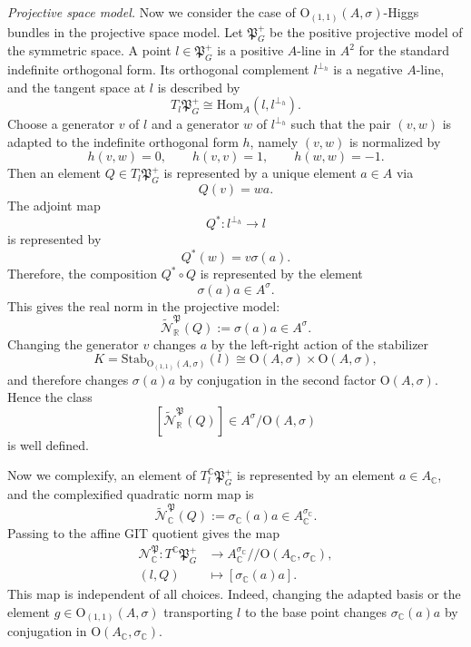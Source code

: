 \documentclass[oneside,11pt]{amsart}
\theoremstyle{definition}
\theoremstyle{remark}
\numberwithin{thm}{section}
\numberwithin{equation}{section}
\begin{document}
\noindent \textit{Projective space model.}
Now we consider the case of $\mathrm{O}_{(1,1)}(A,\sigma)$-Higgs bundles in the projective space model. Let $\mathfrak P_G^+$ be the positive projective model of the symmetric space. A point $l\in\mathfrak{P}_G^+$ is a positive $A$-line in $A^2$ for the standard indefinite orthogonal form. Its orthogonal complement $l^{\perp_h}$ is a negative $A$-line, and the tangent space at $l$ is described by
\[
T_l\mathfrak P_G^+\cong\mathrm{Hom}_A(l,l^{\perp_h}).
\]
Choose a generator $v$ of $l$ and a generator $w$ of $l^{\perp_h}$ such that the pair $(v,w)$ is adapted to the indefinite orthogonal form $h$, namely $(v,w)$ is normalized by
\[
h(v,w)=0,\qquad h(v,v)=1,\qquad h(w,w)=-1.
\]
Then an element $Q\in T_l\mathfrak P_G^+$ is represented by a unique element $a\in A$ via
\[
Q(v)=wa.
\]
The adjoint map
\[
Q^\ast:l^{\perp_h}\longrightarrow l
\]
is represented by
\[
Q^\ast(w)=v\sigma(a).
\]
Therefore, the composition $Q^\ast\circ Q$ is represented by the element
\[
\sigma(a)a\in A^\sigma.
\]
This gives the real norm in the projective model:
\[
\widetilde{\mathcal N}_{\mathbb R}^{\mathfrak P}(Q) := \sigma(a)a\in A^\sigma.
\]
Changing the generator $v$ changes $a$ by the left-right action of the stabilizer
\[
K=\mathrm{Stab}_{\mathrm{O}_{(1,1)}(A,\sigma)}(l)\cong \mathrm{O}(A,\sigma)\times\mathrm{O}(A,\sigma),
\]
and therefore changes $\sigma(a)a$ by conjugation in the second factor $\mathrm{O}(A,\sigma)$. Hence the class
\[
[\widetilde{\mathcal N}_{\mathbb R}^{\mathfrak P}(Q)]\in A^\sigma/\mathrm{O}(A,\sigma)
\]
is well defined.

Now we complexify, an element of $T_l^{\mathbb{C}}\mathfrak P_G^+$ is represented by an element $a\in A_{\mathbb{C}}$, and the complexified quadratic norm map is
\[
\widetilde{\mathcal N}_{\mathbb{C}}^{\mathfrak P}(Q) :=\sigma_{\mathbb{C}}(a)a\in A_{\mathbb{C}}^{\sigma_{\mathbb{C}}}.
\]
Passing to the affine GIT quotient gives the map
\begin{align*}
    \mathcal N_{\mathbb{C}}^{\mathfrak P}: T^{\mathbb{C}}\mathfrak P_G^+&\longrightarrow A_{\mathbb{C}}^{\sigma_{\mathbb{C}}}/\!\!/\mathrm{O}(A_{\mathbb{C}},\sigma_{\mathbb{C}}),\\
    (l,Q)&\longmapsto [\sigma_{\mathbb{C}}(a)a].
\end{align*}
This map is independent of all choices. Indeed, changing the adapted basis or the element $g\in \mathrm{O}_{(1,1)}(A,\sigma)$ transporting $l$ to the base point changes $\sigma_{\mathbb{C}}(a)a$ by conjugation in $\mathrm{O}(A_{\mathbb{C}},\sigma_{\mathbb{C}})$.
\end{document}
